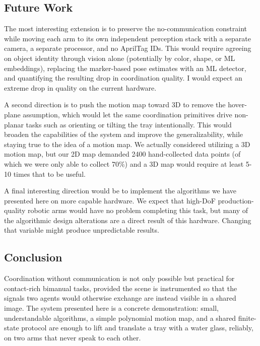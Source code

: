 \subsection{Future Work}
The most interesting extension is to preserve the no-communication constraint while moving each arm to its own independent perception stack with a separate camera, a separate processor, and no AprilTag IDs. This would require agreeing on object identity through vision alone (potentially by color, shape, or ML embeddings), replacing the marker-based pose estimates with an ML detector, and quantifying the resulting drop in coordination quality. I would expect an extreme drop in quality on the current hardware. 

A second direction is to push the motion map toward 3D to remove the hover-plane assumption, which would let the same coordination primitives drive non-planar tasks such as orienting or tilting the tray intentionally. This would broaden the capabilities of the system and improve the generalizability, while staying true to the idea of a motion map. We actually considered utilizing a 3D motion map, but our 2D map demanded 2400 hand-collected data points (of which we were only able to collect 70\%) and a 3D map would require at least 5-10 times that to be useful. 

A final interesting direction would be to implement the algorithms we have presented here on more capable hardware. We expect that high-DoF production-quality robotic arms would have no problem completing this task, but many of the algorithmic design alterations are a direct result of this hardware. Changing that variable might produce unpredictable results.

\subsection{Conclusion}
Coordination without communication is not only possible but
practical for contact-rich bimanual tasks, provided the scene is
instrumented so that the signals two agents would otherwise
exchange are instead visible in a shared image. The system presented here is a concrete demonstration: small, understandable algorithms, a simple polynomial motion map, and a shared finite-state protocol are enough to lift and translate a tray with a water glass, reliably, on two arms that never speak to each other.
